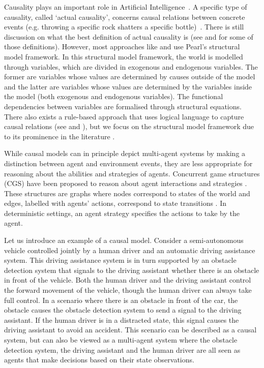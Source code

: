 
Causality plays an important role in Artificial Intelligence~\cite{pearl1995causal,halpern2016actual}. A specific type of causality, called `actual causality',  concerns causal relations between concrete events (e.g. throwing a specific rock shatters a specific bottle)~\cite{halpern2016actual}. There is still discussion on what the best definition of actual causality is (see \cite{halpern2016actual,Hall_2007,gladyshev2023dynamic} and \cite{Beckers_Vennekens_2018} for some of those definitions). 
However, most approaches like \cite{gladyshev2023dynamic} and \cite{Beckers_Vennekens_2018} use Pearl's \cite{pearl1995causal} structural model framework.
In this structural model framework, the world is modelled through  variables, which are divided in exogenous and endogenous variables. 
The former are variables whose values are determined by causes outside of the model and the latter are variables whose values are determined by the variables inside the model (both exogenous and endogenous variables).
The functional dependencies between variables are formalised through structural equations.
There also exists a rule-based approach that uses logical language to capture causal relations (see \cite{bochman2018actual} and \cite{lorni2023rule}), but we focus on the structural model framework due to its prominence in the literature \cite{Alechina_Halpern_Logan_2020,Beckers_Vennekens_2018,chockler2004responsibility,gladyshev2023dynamics}.


While causal models can in principle depict multi-agent systems by making a distinction between agent and environment events, they are less appropriate for reasoning about the abilities and strategies of agents.
Concurrent game structures (CGS) have been proposed to reason about agent interactions and strategies \cite{alur2002alternating}. These structures are graphs where nodes correspond to states of the world and edges, labelled with agents' actions, correspond to state transitions \cite{baier2008principles,gorrieri2017process}. 
In deterministic settings, an agent strategy specifies the actions to take by the agent.

Let us introduce an example of a causal model. 
Consider a semi-autonomous vehicle controlled jointly by a human driver and an automatic driving assistance system.
This driving assistance system is in turn supported by an obstacle detection system that signals to the driving assistant whether there is an obstacle in front of the vehicle.
Both the human driver and the driving assistant control the forward movement of the vehicle, though the human driver can always take full control.
In a scenario where there is an obstacle in front of the car, the obstacle causes the obstacle detection system to send a signal to the driving assistant. 
If the human driver is in a distracted state, this signal causes the driving assistant to avoid an accident.
This scenario can be described as a causal system, but can also be viewed as a multi-agent system where the obstacle detection system, the driving assistant and the human driver are all seen as agents that make decisions based on their state observations.


